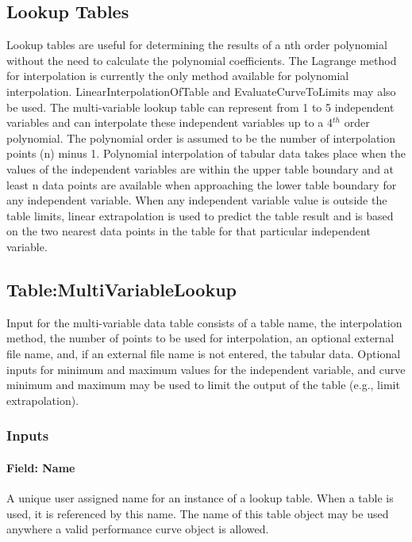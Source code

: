 \subsection{Lookup Tables}\label{lookup-tables}

Lookup tables are useful for determining the results of a nth order polynomial without the need to calculate the polynomial coefficients. The Lagrange method for interpolation is currently the only method available for polynomial interpolation. LinearInterpolationOfTable and EvaluateCurveToLimits may also be used. The multi-variable lookup table can represent from 1 to 5 independent variables and can interpolate these independent variables up to a 4\(^{th}\) order polynomial. The polynomial order is assumed to be the number of interpolation points (n) minus 1. Polynomial interpolation of tabular data takes place when the values of the independent variables are within the upper table boundary and at least n data points are available when approaching the lower table boundary for any independent variable. When any independent variable value is outside the table limits, linear extrapolation is used to predict the table result and is based on the two nearest data points in the table for that particular independent variable.

\subsection{Table:MultiVariableLookup}\label{tablemultivariablelookup}

Input for the multi-variable data table consists of a table name, the interpolation method, the number of points to be used for interpolation, an optional external file name, and, if an external file name is not entered, the tabular data. Optional inputs for minimum and maximum values for the independent variable, and curve minimum and maximum may be used to limit the output of the table (e.g., limit extrapolation).

\subsubsection{Inputs}\label{inputs-2-027}

\paragraph{Field: Name}\label{field-name-2-026}

A unique user assigned name for an instance of a lookup table. When a table is used, it is referenced by this name. The name of this table object may be used anywhere a valid performance curve object is allowed.


